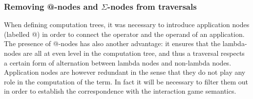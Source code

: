 \subsubsection{Removing @-nodes and $\Sigma$-nodes from traversals}

When defining computation trees, it was necessary to introduce
application nodes (labelled @) in order to connect the operator and
the operand of an application. The presence of @-nodes has also
another advantage: it ensures that the lambda-nodes are all at even
level in the computation tree, and thus a traversal respects a
certain form of alternation between lambda nodes and non-lambda
nodes. Application nodes are however redundant in the sense that
they do not play any role in the computation of the term. In fact it
will be necessary to filter them out in order to establish the
correspondence with the interaction game semantics.

